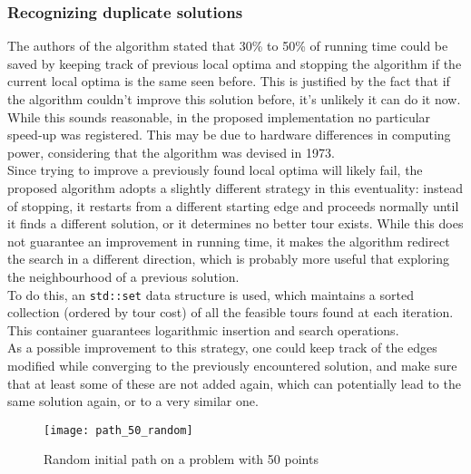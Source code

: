 \subsubsection{Recognizing duplicate solutions}
The authors of the algorithm stated that 30\% to 50\% of running time could be saved by keeping track of previous local optima and stopping the algorithm if the current local optima is the same seen before. This is justified by the fact that if the algorithm couldn't improve this solution before, it's unlikely it can do it now. While this sounds reasonable, in the proposed implementation no particular speed-up was registered. This may be due to hardware differences in computing power, considering that the algorithm was devised in 1973.\\
Since trying to improve a previously found local optima will likely fail, the proposed algorithm adopts a slightly different strategy in this eventuality: instead of stopping, it restarts from a different starting edge and proceeds normally until it finds a different solution, or it determines no better tour exists. While this does not guarantee an improvement in running time, it makes the algorithm redirect the search in a different direction, which is probably more useful that exploring the neighbourhood of a previous solution.\\
To do this, an \texttt{std::set} data structure is used, which maintains a sorted collection (ordered by tour cost) of all the feasible tours found at each iteration. This container guarantees logarithmic insertion and search operations.\\
As a possible improvement to this strategy, one could keep track of the edges modified while converging to the previously encountered solution, and make sure that at least some of these are not added again, which can potentially lead to the same solution again, or to a very similar one.

\begin{figure}[h]
	\centering
	\texttt{[image: path\_50\_random]}
	\caption{Random initial path on a problem with 50 points}
	\label{fig:randomtour}
\end{figure}

